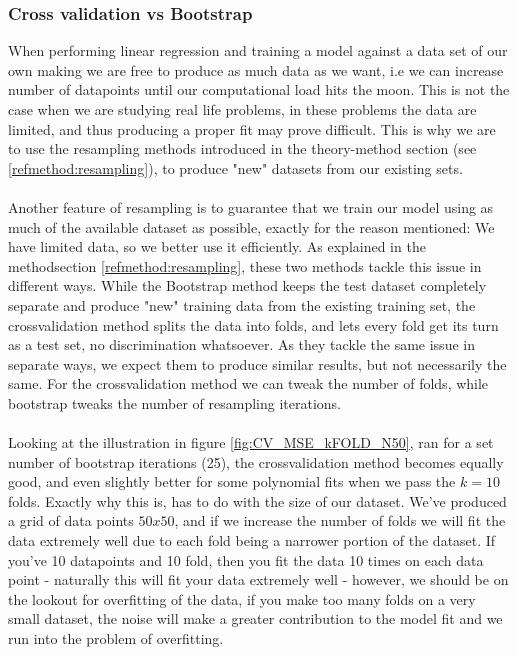 \documentclass[../main.tex]{subfiles}
\begin{document}
\subsubsection{Cross validation vs Bootstrap}
When performing linear regression and training a model against a data set of our own making we are free to produce as much data as we want, i.e we can increase number of datapoints until our computational load hits the moon. This is not the case when we are studying real life problems, in these problems the data are limited, and thus producing a proper fit may prove difficult. This is why we are to use the resampling methods introduced in the theory-method section (see \eqref{refmethod:resampling}), to produce "new" datasets from our existing sets.  \\ \\
\indent Another feature of resampling is to guarantee that we train our model using as much of the available dataset as possible, exactly for the reason mentioned: We have limited data, so we better use it efficiently. As explained in the methodsection \eqref{refmethod:resampling}, these two methods tackle this issue in different ways. While the Bootstrap method keeps the test dataset completely separate and produce "new" training data from the existing training set, the crossvalidation method splits the data into folds, and lets every fold get its turn as a test set, no discrimination whatsoever. As they tackle the same issue in separate ways, we expect them to produce similar results, but not necessarily the same. For the crossvalidation method we can tweak the number of folds, while bootstrap tweaks the number of resampling iterations.  \\ \\\indent Looking at the illustration in figure \eqref{fig:CV_MSE_kFOLD_N50}, ran for a set number of bootstrap iterations (25), the crossvalidation method becomes equally good, and even slightly better for some polynomial fits when we pass the $k=10$ folds. Exactly why this is, has to do with the size of our dataset. We've produced a grid of data points $50x50$, and if we increase the number of folds we will fit the data extremely well due to each fold being a narrower portion of the dataset. If you've 10 datapoints and 10 fold, then you fit the data 10 times on each data point - naturally this will fit your data extremely well - however, we should be on the lookout for overfitting of the data, if you make too many folds on a very small dataset, the noise will make a greater contribution to the model fit and we run into the problem of overfitting.
\end{document}
